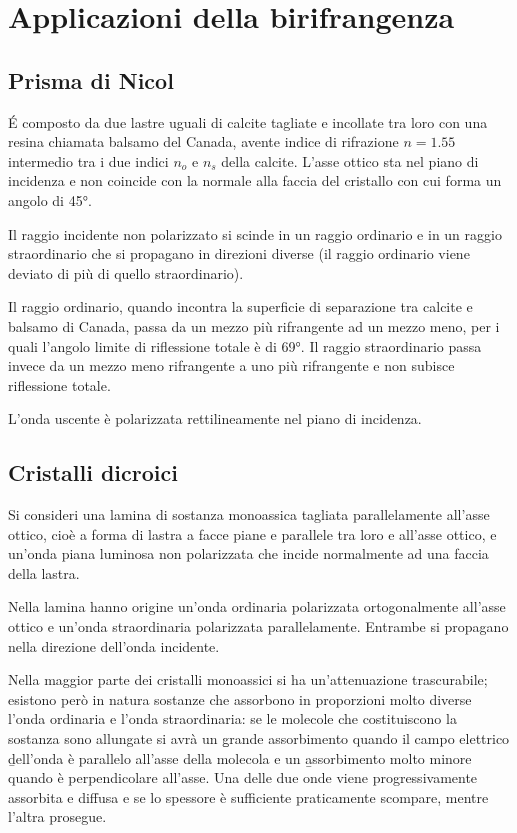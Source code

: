 \section{Applicazioni della birifrangenza}%

\subsection{Prisma di Nicol}
\'E composto da due lastre uguali di calcite tagliate e incollate tra loro con una resina chiamata balsamo del Canada, avente indice di rifrazione $n=1.55$ intermedio tra i due indici $n_o$ e $n_s$ della calcite. L'asse ottico sta nel piano di incidenza e non coincide con la normale alla faccia del cristallo con cui forma un angolo di \ang{45;;}.

Il raggio incidente non polarizzato si scinde in un raggio ordinario e in un raggio straordinario che si propagano in direzioni diverse (il raggio ordinario viene deviato di più di quello straordinario).

Il raggio ordinario, quando incontra la superficie di separazione tra calcite e balsamo di Canada, passa da un mezzo più rifrangente ad un mezzo meno, per i quali l'angolo limite di riflessione totale è di \ang{69;;}. Il raggio straordinario passa invece da un mezzo meno rifrangente a uno più rifrangente e non subisce riflessione totale.

L'onda uscente è polarizzata rettilineamente nel piano di incidenza.

\subsection{Cristalli dicroici}
Si consideri una lamina di sostanza monoassica tagliata parallelamente all'asse ottico, cioè a forma di lastra a facce piane e parallele tra loro e all'asse ottico, e un'onda piana luminosa non polarizzata che incide normalmente ad una faccia della lastra.

Nella lamina hanno origine un'onda ordinaria polarizzata ortogonalmente all'asse ottico e un'onda straordinaria polarizzata parallelamente. Entrambe si propagano nella direzione \dun dell'onda incidente.

Nella maggior parte dei cristalli monoassici si ha un'attenuazione trascurabile; esistono però in natura sostanze che assorbono in proporzioni molto diverse l'onda ordinaria e l'onda straordinaria: se le molecole che costituiscono la sostanza sono allungate si avrà un \b{grande assorbimento quando} il campo elettrico \b{\dE dell'onda è parallelo all'asse} della molecola e un \b{assorbimento molto minore quando \dE è perpendicolare all'asse}. Una delle due onde viene progressivamente assorbita e diffusa e se lo spessore è sufficiente praticamente scompare, mentre l'altra prosegue.


